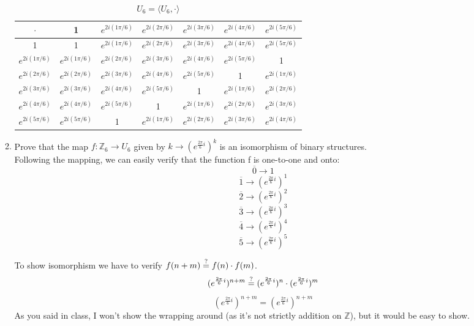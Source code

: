 \begin{enumerate}
\begin{enumerate}
\begin{table}[h!]
  \begin{center}
    \begin{tabular}{|c|c|c|c|c|c|c|}
      \hline
      $\cdot$       & 1              & $e^{2i(1\pi/6)}$ & $e^{2i(2\pi/6)}$ & $e^{2i(3\pi/6)}$ & $e^{2i(4\pi/6)}$ & $e^{2i(5\pi/6)}$\\
      \hline                  
      1             & 1 & $e^{2i(1\pi/6)}$ & $e^{2i(2\pi/6)}$ & $e^{2i(3\pi/6)}$ & $e^{2i(4\pi/6)}$ & $e^{2i(5\pi/6)}$\\
      $e^{2i(1\pi/6)}$ & $e^{2i(1\pi/6)}$ & $e^{2i(2\pi/6)}$ & $e^{2i(3\pi/6)}$ & $e^{2i(4\pi/6)}$ & $e^{2i(5\pi/6)}$ & 1\\
      $e^{2i(2\pi/6)}$ & $e^{2i(2\pi/6)}$ & $e^{2i(3\pi/6)}$ & $e^{2i(4\pi/6)}$ & $e^{2i(5\pi/6)}$ & 1 & $e^{2i(1\pi/6)}$\\
      $e^{2i(3\pi/6)}$ & $e^{2i(3\pi/6)}$ & $e^{2i(4\pi/6)}$ & $e^{2i(5\pi/6)}$ & 1 & $e^{2i(1\pi/6)}$ & $e^{2i(2\pi/6)}$\\
      $e^{2i(4\pi/6)}$ & $e^{2i(4\pi/6)}$ & $e^{2i(5\pi/6)}$ & 1 & $e^{2i(1\pi/6)}$ & $e^{2i(2\pi/6)}$ & $e^{2i(3\pi/6)}$\\
      $e^{2i(5\pi/6)}$ & $e^{2i(5\pi/6)}$ & 1 & $e^{2i(1\pi/6)}$ & $e^{2i(2\pi/6)}$ & $e^{2i(3\pi/6)}$ & $e^{2i(4\pi/6)}$\\
      \hline
    \end{tabular}
    \caption{$U_6 = \langle U_6, \cdot \rangle$}
  \end{center}
\end{table}

\item Prove that the map $f : \mathds{Z}_6 \rightarrow U_6$ given by $k \rightarrow (e^{\frac{2\pi}{6}i})^k$ is an isomorphism of binary structures.\\

Following the mapping, we can easily verify that the function f is one-to-one and onto:
$$\overline{0} \rightarrow 1$$
$$\overline{1} \rightarrow (e^{\frac{2\pi}{6}i})^1$$
$$\overline{2} \rightarrow (e^{\frac{2\pi}{6}i})^2$$
$$\overline{3} \rightarrow (e^{\frac{2\pi}{6}i})^3$$
$$\overline{4} \rightarrow (e^{\frac{2\pi}{6}i})^4$$
$$\overline{5} \rightarrow (e^{\frac{2\pi}{6}i})^5$$

To show isomorphism we have to verify $f(n+m) \stackrel{?}{=} f(n) \cdot f(m)$.
$$(e^{\frac{2\pi}{6}i})^{n+m} \stackrel{?}{=} (e^{\frac{2\pi}{6}i})^n \cdot (e^{\frac{2\pi}{6}i})^m$$
$$(e^{\frac{2\pi}{6}i})^{n+m} = (e^{\frac{2\pi}{6}i})^{n+m}$$
As you said in class, I won't show the wrapping around (as it's not strictly addition on $\mathds{Z}$), but it would be easy to show.\\


\end{enumerate}
\end{enumerate}

